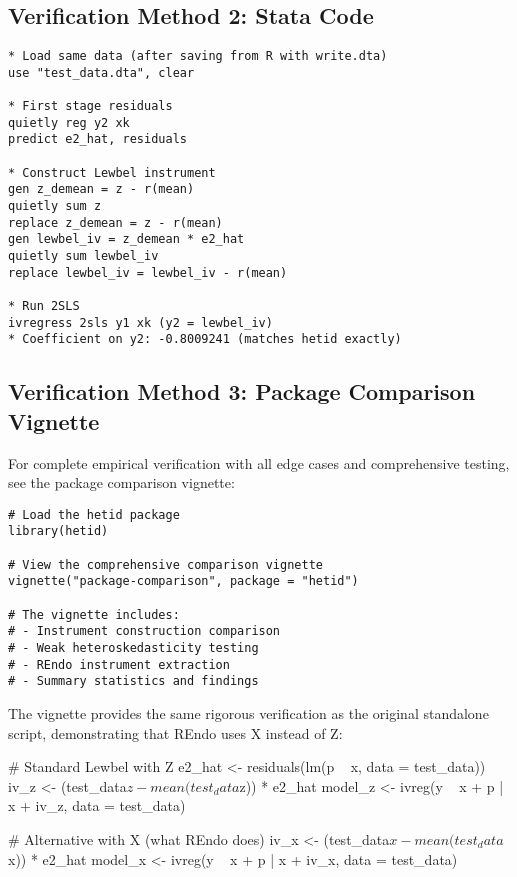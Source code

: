 \documentclass[12pt]{article}
\begin{document}
\subsection{Verification Method 2: Stata Code}

\begin{lstlisting}[caption={Stata code producing identical results}]
* Load same data (after saving from R with write.dta)
use "test_data.dta", clear

* First stage residuals
quietly reg y2 xk
predict e2_hat, residuals

* Construct Lewbel instrument
gen z_demean = z - r(mean)
quietly sum z
replace z_demean = z - r(mean)
gen lewbel_iv = z_demean * e2_hat
quietly sum lewbel_iv
replace lewbel_iv = lewbel_iv - r(mean)

* Run 2SLS
ivregress 2sls y1 xk (y2 = lewbel_iv)
* Coefficient on y2: -0.8009241 (matches hetid exactly)
\end{lstlisting}

\subsection{Verification Method 3: Package Comparison Vignette}

For complete empirical verification with all edge cases and comprehensive testing, see the package comparison vignette:

\begin{lstlisting}[caption={Access complete verification in R}]
# Load the hetid package
library(hetid)

# View the comprehensive comparison vignette
vignette("package-comparison", package = "hetid")

# The vignette includes:
# - Instrument construction comparison
# - Weak heteroskedasticity testing
# - REndo instrument extraction
# - Summary statistics and findings
\end{lstlisting}

The vignette provides the same rigorous verification as the original standalone script, demonstrating that REndo uses X instead of Z:

# Standard Lewbel with Z
e2_hat <- residuals(lm(p ~ x, data = test_data))
iv_z <- (test_data$z - mean(test_data$z)) * e2_hat
model_z <- ivreg(y ~ x + p | x + iv_z, data = test_data)

# Alternative with X (what REndo does)
iv_x <- (test_data$x - mean(test_data$x)) * e2_hat
model_x <- ivreg(y ~ x + p | x + iv_x, data = test_data)
\end{document}
